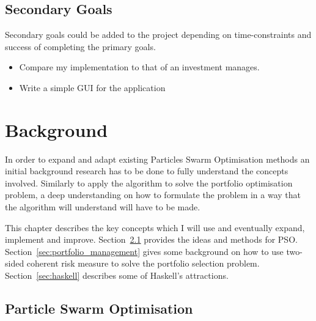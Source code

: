 \documentclass{pdfmx4020}
\begin{document}
  \section{Secondary Goals} %
  \label{sec:secondary_goals}
  Secondary goals could be added to the project depending on time-constraints and success of completing the primary goals.
  \begin{itemize}
    \item Compare my implementation to that of an investment manages. 
    \item Write a simple GUI for the application
  \end{itemize}

\chapter{Background}\label{chap:background}
  In order to expand and adapt existing Particles Swarm Optimisation methods an initial background research has to be done to fully understand the concepts involved. Similarly to apply the algorithm to solve the portfolio optimisation problem, a deep understanding on how to formulate the problem in a way that the algorithm will understand will have to be made. 

  This chapter describes the key concepts which I will use and eventually expand, implement and improve. Section~\ref{sec:particle_swarm_optimisation} provides the ideas and methods for PSO. Section~\ref{sec:portfolio_management} gives some background on how to use two-sided coherent risk measure\cite{two_sided_risk} to solve the portfolio selection problem. Section~\ref{sec:haskell} describes some of Haskell's attractions. 


  \section{Particle Swarm Optimisation} %
  \label{sec:particle_swarm_optimisation}
\end{document}
